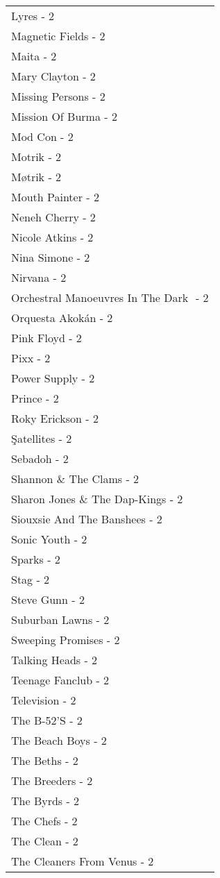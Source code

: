 \documentclass[
]{article}
\begin{document}
\begin{longtable}{l}
Lyres - 2 \\ 
Magnetic Fields - 2 \\ 
Maita - 2 \\ 
Mary Clayton - 2 \\ 
Missing Persons - 2 \\ 
Mission Of Burma - 2 \\ 
Mod Con - 2 \\ 
Motrik - 2 \\ 
Møtrik - 2 \\ 
Mouth Painter - 2 \\ 
Neneh Cherry - 2 \\ 
Nicole Atkins - 2 \\ 
Nina Simone - 2 \\ 
Nirvana - 2 \\ 
Orchestral Manoeuvres In The Dark ‎ - 2 \\ 
Orquesta Akokán - 2 \\ 
Pink Floyd - 2 \\ 
Pixx - 2 \\ 
Power Supply - 2 \\ 
Prince - 2 \\ 
Roky Erickson - 2 \\ 
Şatellites - 2 \\ 
Sebadoh - 2 \\ 
Shannon \& The Clams - 2 \\ 
Sharon Jones \& The Dap-Kings - 2 \\ 
Siouxsie And The Banshees - 2 \\ 
Sonic Youth - 2 \\ 
Sparks - 2 \\ 
Stag - 2 \\ 
Steve Gunn - 2 \\ 
Suburban Lawns - 2 \\ 
Sweeping Promises - 2 \\ 
Talking Heads - 2 \\ 
Teenage Fanclub - 2 \\ 
Television - 2 \\ 
The B-52'S - 2 \\ 
The Beach Boys - 2 \\ 
The Beths - 2 \\ 
The Breeders - 2 \\ 
The Byrds - 2 \\ 
The Chefs - 2 \\ 
The Clean - 2 \\ 
The Cleaners From Venus - 2 \\ 

\end{longtable}
\end{document}

